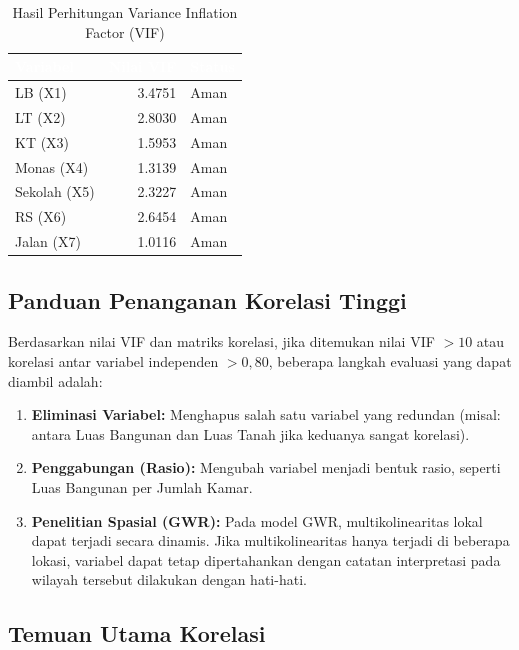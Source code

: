 \documentclass[12pt,a4paper]{article}
\begin{document}
\begin{table}[H]
\centering
\caption{Hasil Perhitungan Variance Inflation Factor (VIF)}
\label{tab:vif}
\begin{tabular}{lrl}
\toprule
\rowcolor{headerblue}
\textcolor{white}{\textbf{Variabel}} & \textcolor{white}{\textbf{Nilai VIF}} & \textcolor{white}{\textbf{Status}} \\
\midrule
\rowcolor{rowlight}
LB (X1) & 3.4751 & Aman \\
LT (X2) & 2.8030 & Aman \\
\rowcolor{rowlight}
KT (X3) & 1.5953 & Aman \\
Monas (X4) & 1.3139 & Aman \\
\rowcolor{rowlight}
Sekolah (X5) & 2.3227 & Aman \\
RS (X6) & 2.6454 & Aman \\
\rowcolor{rowlight}
Jalan (X7) & 1.0116 & Aman \\
\bottomrule
\end{tabular}
\end{table}

\subsection{Panduan Penanganan Korelasi Tinggi}
Berdasarkan nilai VIF dan matriks korelasi, jika ditemukan nilai VIF $> 10$ atau korelasi antar variabel independen $> 0{,}80$, beberapa langkah evaluasi yang dapat diambil adalah:

\begin{enumerate}
    \item \textbf{Eliminasi Variabel:} Menghapus salah satu variabel yang redundan (misal: antara Luas Bangunan dan Luas Tanah jika keduanya sangat korelasi).
    \item \textbf{Penggabungan (Rasio):} Mengubah variabel menjadi bentuk rasio, seperti Luas Bangunan per Jumlah Kamar.
    \item \textbf{Penelitian Spasial (GWR):} Pada model GWR, multikolinearitas lokal dapat terjadi secara dinamis. Jika multikolinearitas hanya terjadi di beberapa lokasi, variabel dapat tetap dipertahankan dengan catatan interpretasi pada wilayah tersebut dilakukan dengan hati-hati.
\end{enumerate}

\subsection{Temuan Utama Korelasi}
\end{document}
